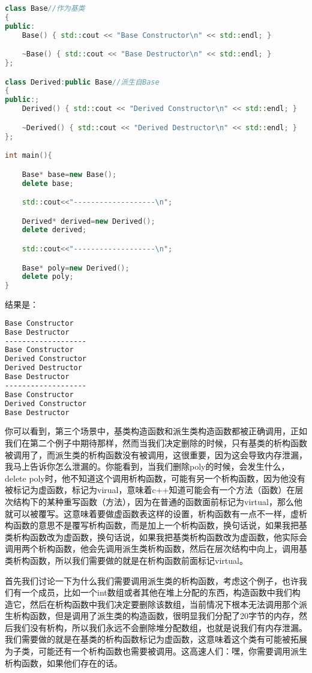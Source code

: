 \begin{lstlisting}[language=c++]
class Base//作为基类
{
public:
    Base() { std::cout << "Base Constructor\n" << std::endl; }

    ~Base() { std::cout << "Base Destructor\n" << std::endl; }
};

class Derived:public Base//派生自Base
{
public:;
    Derived() { std::cout << "Derived Constructor\n" << std::endl; }

    ~Derived() { std::cout << "Derived Destructor\n" << std::endl; }
};

int main(){

    Base* base=new Base();
    delete base;

    std::cout<<"-------------------\n";

    Derived* derived=new Derived();
    delete derived;

    std::cout<<"-------------------\n";

    Base* poly=new Derived();
    delete poly;
}
\end{lstlisting}

结果是：

\begin{lstlisting}[language=bash]
Base Constructor
Base Destructor
-------------------
Base Constructor
Derived Constructor
Derived Destructor
Base Destructor
-------------------
Base Constructor
Derived Constructor
Base Destructor
\end{lstlisting}

你可以看到，第三个场景中，基类构造函数和派生类构造函数都被正确调用，正如我们在第二个例子中期待那样，然而当我们决定删除的时候，只有基类的析构函数被调用了，而派生类的析构函数没有被调用，这很重要，因为这会导致内存泄漏，我马上告诉你怎么泄漏的。你能看到，当我们删除{\ncodestyle poly}的时候，会发生什么，{\ncodestyle delete poly}时，他不知道这个调用析构函数，可能有另一个析构函数，因为他没有被标记为虚函数，标记为{\ncodestyle virual}，意味着c++知道可能会有一个方法（函数）在层次结构下的某种重写函数（方法），因为在普通的函数面前标记为{\ncodestyle virtual}，那么他就可以被覆写。这意味着要做虚函数表这样的设置，析构函数有一点不一样，虚析构函数的意思不是覆写析构函数，而是加上一个析构函数，换句话说，如果我把基类析构函数改为虚函数，换句话说，如果我把基类析构函数改为虚函数，他实际会调用两个析构函数，他会先调用派生类析构函数，然后在层次结构中向上，调用基类析构函数，所以我们需要做的就是在析构函数前面标记{\ncodestyle virtual}。

首先我们讨论一下为什么我们需要调用派生类的析构函数，考虑这个例子，也许我们有一个成员，比如一个int数组或者其他在堆上分配的东西，构造函数中我们构造它，然后在析构函数中我们决定要删除该数组，当前情况下根本无法调用那个派生析构函数，但是调用了派生类的构造函数，很明显我们分配了20字节的内存，然后我们没有析构，所以我们永远不会删除堆分配数组，也就是说我们有内存泄漏。我们需要做的就是在基类的析构函数标记为虚函数，这意味着这个类有可能被拓展为子类，可能还有一个析构函数也需要被调用。这高速人们：嘿，你需要调用派生析构函数，如果他们存在的话。


